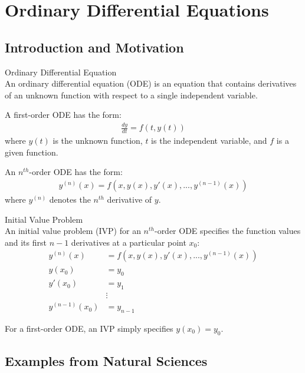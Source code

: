 

\section{Ordinary Differential Equations}

\subsection{Introduction and Motivation}

\begin{definition}{Ordinary Differential Equation}\\
An ordinary differential equation (ODE) is an equation that contains derivatives of an unknown function with respect to a single independent variable. 

A first-order ODE has the form:
\begin{align*}
\frac{dy}{dt} = f(t, y(t))
\end{align*}
where $y(t)$ is the unknown function, $t$ is the independent variable, and $f$ is a given function.

An $n^{th}$-order ODE has the form:
\begin{align*}
y^{(n)}(x) = f(x, y(x), y'(x), ..., y^{(n-1)}(x))
\end{align*}
where $y^{(n)}$ denotes the $n^{th}$ derivative of $y$.
\end{definition}

\begin{definition}{Initial Value Problem}\\
An initial value problem (IVP) for an $n^{th}$-order ODE specifies the function values and its first $n-1$ derivatives at a particular point $x_0$:
\begin{align*}
y^{(n)}(x) &= f(x, y(x), y'(x), ..., y^{(n-1)}(x))\\
y(x_0) &= y_0\\
y'(x_0) &= y_1\\
&\vdots\\
y^{(n-1)}(x_0) &= y_{n-1}
\end{align*}

For a first-order ODE, an IVP simply specifies $y(x_0) = y_0$.
\end{definition}

\subsection{Examples from Natural Sciences}

